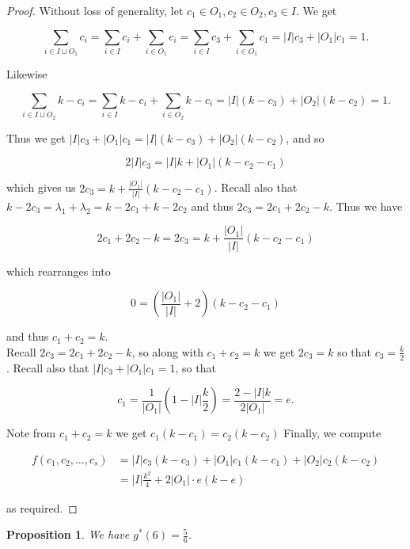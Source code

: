 \documentclass{article}
\newtheorem{proposition}{Proposition}
\begin{document}
\begin{proof}
Without loss of generality, let $c_1 \in O_1, c_2 \in O_2, c_3 \in I$. We get 

$$\sum_{i \in I \sqcup O_1} c_i = \sum_{i \in I} c_i + \sum_{i \in O_1} c_i = \sum_{i \in I} c_3 + \sum_{i \in O_1} c_1 = |I|c_3 + |O_1|c_1 = 1.$$

\noindent
Likewise

$$\sum_{i \in I \sqcup O_2} k-c_i = \sum_{i \in I}k- c_i + \sum_{i \in O_2}k- c_i = |I|(k-c_3) + |O_2|(k-c_2) = 1.$$

\noindent
Thus we get $|I|c_3 + |O_1|c_1 =|I|(k-c_3) + |O_2|(k-c_2)$, and so 

$$2|I|c_3 = |I|k+|O_1|(k-c_2-c_1)$$

\noindent
which gives us $2c_3 = k+ \frac{|O_1|}{|I|}(k-c_2-c_1)$. Recall also that $k-2c_3 = \lambda_1 + \lambda_2 = k-2c_1+k-2c_2 $ and thus $2c_3 = 2c_1+2c_2-k$. Thus we have 

$$2c_1+2c_2-k = 2c_3 = k+\frac{|O_1|}{|I|}(k-c_2-c_1)$$

\noindent
which rearranges into

$$0 = (\frac{|O_1|}{|I|} + 2)(k-c_2-c_1)$$

\noindent
and thus $c_1+c_2 = k$. \\

Recall $2c_3 = 2c_1+2c_2 - k$, so along with $c_1+c_2 = k$ we get $2c_3 = k$ so that $c_3 = \frac{k}{2}$. Recall also that $|I|c_3 + |O_1|c_1 = 1$, so that 

$$c_1 = \frac{1}{|O_1|}(1-|I|\frac{k}{2}) = \frac{2-|I|k}{2|O_1|} = e.$$

\noindent
Note from $c_1+c_2 = k$ we get $c_1(k-c_1) = c_2(k-c_2)$ Finally, we compute

\begin{align*}
f(c_1,c_2,\ldots,c_s) &= |I|c_3(k-c_3) + |O_1|c_1(k-c_1)+|O_2|c_2(k-c_2) \\
&= |I|\frac{k^2}{4} + 2|O_1| \cdot e(k-e) 
\end{align*}

\noindent
as required.
\end{proof}


\begin{proposition}
We have $g^*(6) = \frac{5}{6}$.
\end{proposition}
\end{document}
